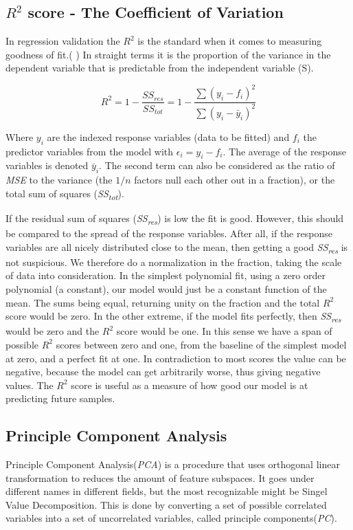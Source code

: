\subsection{$R^2$ score - The Coefficient of Variation}

	In regression validation the $R^2$ is the standard when it comes to measuring goodness of fit.(\cite{coef} ) In straight terms it is the proportion of the variance in the dependent variable that is predictable from the independent variable (S).

\begin{equation}\label{eq: R squared}
	R^2 =1 - \frac{SS_{res}}{SS_{tot}} =  1 - \frac{ \sum(y_i-f_i)^2 }{ \sum(y_i-\bar{y}_i)^2 }
\end{equation}

	Where $y_i$ are the indexed response variables (data  to be fitted) and $f_i$ the predictor variables from the model with $\epsilon_i = y_i - f_i$. The average of the response variables is denoted $\bar{y}_i$. The second term can also be considered as the ratio of \textit{MSE} to the variance (the $1/n$ factors null each other out in a fraction), or the total sum of squares (\textit{SS\textsubscript{tot}}). 
	
	If the residual sum of squares (\textit{SS\textsubscript{res}}) is low the fit is good. However, this should be compared to the spread of the response variables. After all, if the response variables are all nicely distributed close to the mean, then getting a good \textit{SS\textsubscript{res}} is not suspicious. We therefore do a normalization in the fraction, taking the scale of data into consideration. In the simplest polynomial fit, using a zero order polynomial (a constant), our model would just be a constant function of the mean. The sums being equal, returning unity on the fraction and the total $R^2$ score would be zero. In the other extreme, if the model fits perfectly, then \textit{SS\textsubscript{res}} would be zero and the $R^2$ score would be one. In this sense we have a span of possible $R^2$ scores between zero and one, from the baseline of the simplest model at zero, and a perfect fit at one. In contradiction to most scores the value can be negative, because the model can get arbitrarily worse, thus giving negative values.
	The $R^2$ score is useful as a measure of how good our model is at predicting future samples.
	 

\subsection{Principle Component Analysis }
	Principle Component Analysis(\textit{PCA}) is a procedure that uses orthogonal linear transformation to reduces the amount of feature subspaces. It goes under different names in different fields, but the most recognizable might be Singel Value Decomposition. This is done by converting a set of possible correlated variables into a set of uncorrelated variables, called principle components(\textit{PC}). 
	
